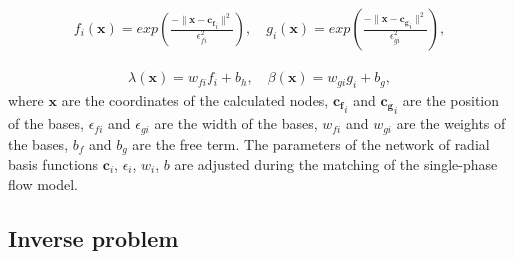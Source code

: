 \documentclass[
11pt,%
tightenlines,%
twoside,%
onecolumn,%
nofloats,%
nobibnotes,%
nofootinbib,%
superscriptaddress,%
noshowpacs,%
centertags]%
{revtex4}
\begin{document}
\begin{eqnarray}\label{rbf}
	f_i(\mathbf{x}) = exp \left(\frac{-\lVert \mathbf{x} - \mathbf{c_f}_i \rVert^2}{\epsilon_{fi}^2}\right), \quad
	g_i(\mathbf{x}) = exp \left(\frac{-\lVert \mathbf{x} - \mathbf{c_g}_i \rVert^2}{\epsilon_{gi}^2}\right),
\end{eqnarray}

\begin{eqnarray*}
	\lambda(\mathbf{x}) = w_{fi}f_i + b_h, \quad
	\beta(\mathbf{x}) = w_{gi}g_i + b_g,
\end{eqnarray*}
where $\mathbf{x}$ are the coordinates of the calculated nodes, $\mathbf{c_f}_i$ and $\mathbf{c_g}_i$ are the position of the bases, $\epsilon_{fi}$ and $\epsilon_{gi}$ are the width of the bases, $w_{fi}$ and $w_{gi}$ are the weights of the bases, $b_f$ and $b_g$ are the free term. The parameters of the network of radial basis functions $\mathbf{c}_i$, $\epsilon_i$, $w_i$, $b$ are adjusted during the matching of the single-phase flow model.

\subsection{Inverse problem}
\end{document}
